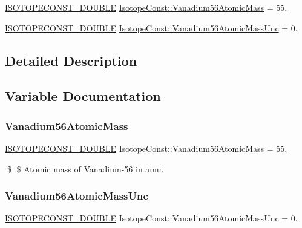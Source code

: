 \begin{DoxyCompactItemize}
\item 
\mbox{\hyperlink{group___isotope_const-_macros_ga8f45a7272ce02c0b4c65c44636ed719a}{I\+S\+O\+T\+O\+P\+E\+C\+O\+N\+S\+T\+\_\+\+D\+O\+U\+B\+LE}} \mbox{\hyperlink{group___isotope_const-_vanadium-_v56_gadd8f7403076bc03016e167508c84c3a3}{Isotope\+Const\+::\+Vanadium56\+Atomic\+Mass}} = 55.
\item 
\mbox{\hyperlink{group___isotope_const-_macros_ga8f45a7272ce02c0b4c65c44636ed719a}{I\+S\+O\+T\+O\+P\+E\+C\+O\+N\+S\+T\+\_\+\+D\+O\+U\+B\+LE}} \mbox{\hyperlink{group___isotope_const-_vanadium-_v56_ga776245b2a6a1f9efcd9407b049eca853}{Isotope\+Const\+::\+Vanadium56\+Atomic\+Mass\+Unc}} = 0.
\end{DoxyCompactItemize}


\subsection{Detailed Description}


\subsection{Variable Documentation}
\mbox{\label{group___isotope_const-_vanadium-_v56_gadd8f7403076bc03016e167508c84c3a3}} 
\subsubsection{\texorpdfstring{Vanadium56\+Atomic\+Mass}{Vanadium56AtomicMass}}
{\footnotesize\ttfamily \mbox{\hyperlink{group___isotope_const-_macros_ga8f45a7272ce02c0b4c65c44636ed719a}{I\+S\+O\+T\+O\+P\+E\+C\+O\+N\+S\+T\+\_\+\+D\+O\+U\+B\+LE}} Isotope\+Const\+::\+Vanadium56\+Atomic\+Mass = 55.}

\$ \$ Atomic mass of Vanadium-\/56 in amu. \mbox{\label{group___isotope_const-_vanadium-_v56_ga776245b2a6a1f9efcd9407b049eca853}} 
\subsubsection{\texorpdfstring{Vanadium56\+Atomic\+Mass\+Unc}{Vanadium56AtomicMassUnc}}
{\footnotesize\ttfamily \mbox{\hyperlink{group___isotope_const-_macros_ga8f45a7272ce02c0b4c65c44636ed719a}{I\+S\+O\+T\+O\+P\+E\+C\+O\+N\+S\+T\+\_\+\+D\+O\+U\+B\+LE}} Isotope\+Const\+::\+Vanadium56\+Atomic\+Mass\+Unc = 0.}

